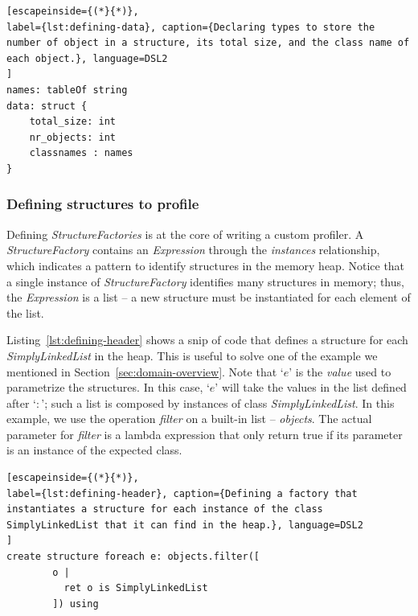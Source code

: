 \begin{lstlisting}[escapeinside={(*}{*)}, 
label={lst:defining-data}, caption={Declaring types to store the number of object in a structure, its total size, and the class name of each object.}, language=DSL2
]
names: tableOf string
data: struct {
	total_size: int
	nr_objects: int
	classnames : names
}
\end{lstlisting}

\subsubsection*{Defining structures to profile}
Defining \textit{StructureFactories} is at the core of writing a custom profiler.
A \textit{StructureFactory} contains an \textit{Expression} through the \textit{instances} relationship, which indicates a pattern to identify structures in the memory heap.
Notice that a single instance of \textit{StructureFactory} identifies many structures in memory; thus, the \textit{Expression} is a list -- a new structure must be instantiated for each element of the list.


Listing~\ref{lst:defining-header} shows a snip of code that defines a structure for each \textit{SimplyLinkedList} in the heap.
This is useful to solve one of the example we mentioned in Section~\ref{sec:domain-overview}.
Note that `$e$' is the \textit{value} used to parametrize the structures.
In this case, `$e$' will take the values in the list defined after `$:$'; such a list is composed by instances of class \textit{SimplyLinkedList}.
In this example, we use the operation \textit{filter} on a built-in list -- \textit{objects}.
The actual parameter for \textit{filter} is a lambda expression that only return true if its parameter is an instance of the expected class. 

\begin{lstlisting}[escapeinside={(*}{*)}, 
label={lst:defining-header}, caption={Defining a factory that instantiates a structure for each instance of the class SimplyLinkedList that it can find in the heap.}, language=DSL2
]
create structure foreach e: objects.filter([
		o | 
		  ret o is SimplyLinkedList
		]) using
\end{lstlisting}

